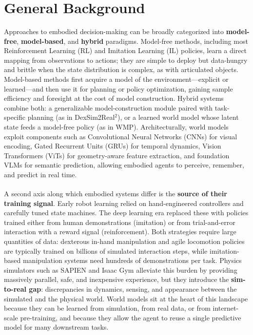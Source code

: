 \documentclass[12pt,a4paper,final]{extreport}
\begin{document}
\section{General Background}

\paragraph{} Approaches to embodied decision-making can be broadly categorized into \textbf{model-free}, \textbf{model-based}, and \textbf{hybrid} paradigms. Model-free methods, including most Reinforcement Learning (RL) and Imitation Learning (IL) policies, learn a direct mapping from observations to actions; they are simple to deploy but data-hungry and brittle when the state distribution is complex, as with articulated objects. Model-based methods first acquire a model of the environment---explicit or learned---and then use it for planning or policy optimization, gaining sample efficiency and foresight at the cost of model construction. Hybrid systems combine both: a generalizable model-construction module paired with task-specific planning (as in DexSim2Real$^2$), or a learned world model whose latent state feeds a model-free policy (as in WMP). Architecturally, world models exploit components such as Convolutional Neural Networks (CNNs) for visual encoding, Gated Recurrent Units (GRUs) for temporal dynamics, Vision Transformers (ViTs) for geometry-aware feature extraction, and foundation VLMs for semantic prediction, allowing embodied agents to perceive, remember, and predict in real time.

\paragraph{} A second axis along which embodied systems differ is the \textbf{source of their training signal}. Early robot learning relied on hand-engineered controllers and carefully tuned state machines. The deep learning era replaced these with policies trained either from human demonstrations (imitation) or from trial-and-error interaction with a reward signal (reinforcement). Both strategies require large quantities of data: dexterous in-hand manipulation and agile locomotion policies are typically trained on billions of simulated interaction steps, while imitation-based manipulation systems need hundreds of demonstrations per task. Physics simulators such as SAPIEN and Isaac Gym alleviate this burden by providing massively parallel, safe, and inexpensive experience, but they introduce the \textbf{sim-to-real gap}: discrepancies in dynamics, sensing, and appearance between the simulated and the physical world. World models sit at the heart of this landscape because they can be learned from simulation, from real data, or from internet-scale pre-training, and because they allow the agent to reuse a single predictive model for many downstream tasks.
\end{document}
